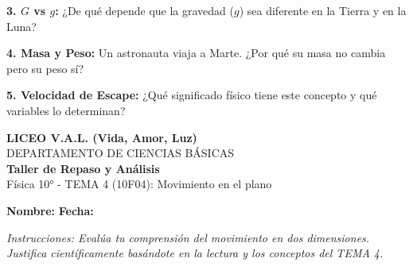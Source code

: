 \documentclass[12pt, letterpaper]{article}
\newif\ifshowanswers
\newcommand{\respAbierta}[2][3cm]{
	\ifshowanswers
	\par\vspace{0.2cm}
	\textbf{\textcolor{blue}{Respuesta Esperada:}} \textcolor{blue}{#2}
	\par\vspace{0.2cm}
	\else
	\par\vspace{#1} %
	\fi
}
\begin{document}
	\vspace{0.2cm}
	\noindent \textbf{3. $G$ vs $g$:} ¿De qué depende que la gravedad ($g$) sea diferente en la Tierra y en la Luna?
	\respAbierta[4cm]{$G$ es una constante universal. En cambio, $g$ es la aceleración local y depende de la masa y el radio del planeta. Como la Luna tiene menor masa y radio que la Tierra, su gravedad es menor.}
	
	\vspace{0.2cm}
	\noindent \textbf{4. Masa y Peso:} Un astronauta viaja a Marte. ¿Por qué su masa no cambia pero su peso sí?
	\respAbierta[3cm]{La masa es la cantidad de materia intrínseca y no cambia. El peso ($w = m \cdot g$) es la fuerza de atracción del planeta; al cambiar la gravedad del planeta, el peso cambia forzosamente.}
	
	\vspace{0.2cm}
	\noindent \textbf{5. Velocidad de Escape:} ¿Qué significado físico tiene este concepto y qué variables lo determinan?
	\respAbierta[3.5cm]{Es la velocidad mínima para superar la atracción gravitacional de un cuerpo celeste y no volver a caer. Depende exclusivamente de la Masa ($M$) y el Radio ($R$) del planeta.}
	
	\newpage
	\begin{center} 
		{\Large \textbf{LICEO V.A.L. (Vida, Amor, Luz)}}\\[0.1cm] 
		{\large DEPARTAMENTO DE CIENCIAS BÁSICAS}\\[0.1cm] 
		\textbf{Taller de Repaso y Análisis} \\[0.1cm] 
		Física 10° - TEMA 4 (10F04): Movimiento en el plano
	\end{center}
	
	\vspace{0.3cm}
	\noindent \textbf{Nombre:} \underline{\hspace{8cm}} \hspace{1cm}\textbf{Fecha:} \underline{\hspace{3cm}}
	
	\vspace{0.3cm}
	\begin{tcolorbox}[colback=gray!10!white, colframe=black, arc=1mm]
		\textit{Instrucciones: Evalúa tu comprensión del movimiento en dos dimensiones. Justifica científicamente basándote en la lectura y los conceptos del TEMA 4.}
	\end{tcolorbox}
	
\end{document}
